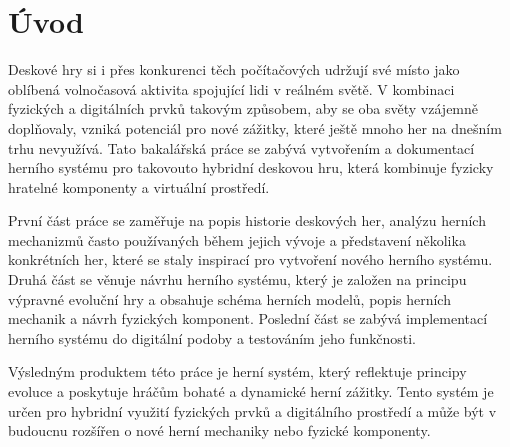 \chapter{Úvod}

Deskové hry si i přes konkurenci těch počítačových udržují své místo jako oblíbená volnočasová aktivita spojující lidi v reálném světě. V kombinaci fyzických a digitálních prvků takovým způsobem, aby se oba světy vzájemně doplňovaly, vzniká potenciál pro nové zážitky, které ještě mnoho her na dnešním trhu nevyužívá. Tato bakalářská práce se zabývá vytvořením a dokumentací herního systému pro takovouto hybridní deskovou hru, která kombinuje fyzicky hratelné komponenty a virtuální prostředí.

První část práce se zaměřuje na popis historie deskových her, analýzu herních mechanizmů často používaných během jejich vývoje a představení několika konkrétních her, které se staly inspirací pro vytvoření nového herního systému. Druhá část se věnuje návrhu herního systému, který je založen na principu výpravné evoluční hry a obsahuje schéma herních modelů, popis herních mechanik a návrh fyzických komponent. Poslední část se zabývá implementací herního systému do digitální podoby a testováním jeho funkčnosti.

Výsledným produktem této práce je herní systém, který reflektuje principy evoluce a poskytuje hráčům bohaté a dynamické herní zážitky. Tento systém je určen pro hybridní využití fyzických prvků a digitálního prostředí a může být v budoucnu rozšířen o nové herní mechaniky nebo fyzické komponenty.
